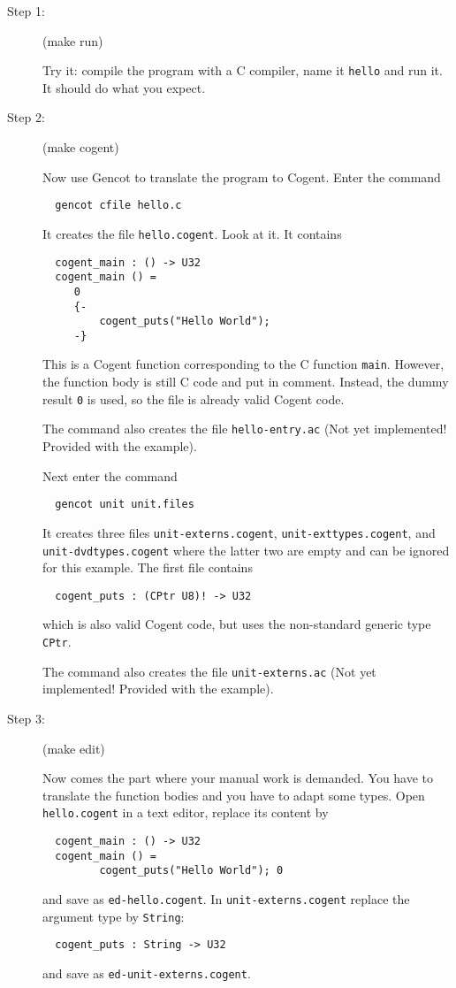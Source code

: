\documentclass[a4paper]{report}
\newcommand{\code}[1]{\textnormal{\texttt{#1}}}
\begin{document}
\begin{description}
\item[Step 1:] (make run)

Try it: compile the program with a C compiler, name it \code{hello} and run it. It should do what you expect.

\item[Step 2:] (make cogent)

Now use Gencot to translate the program to Cogent. Enter the command
\begin{verbatim}
  gencot cfile hello.c
\end{verbatim}
It creates the file \code{hello.cogent}. Look at it. It contains
\begin{verbatim}
  cogent_main : () -> U32
  cogent_main () =
     0
     {-
         cogent_puts("Hello World");
     -}
\end{verbatim}
This is a Cogent function corresponding to the C function \code{main}. However, the function body is still C code
and put in comment. Instead, the dummy result \code{0} is used, so the file is already valid Cogent code.

The command also creates the file \code{hello-entry.ac} (Not yet implemented! Provided with the example).

Next enter the command
\begin{verbatim}
  gencot unit unit.files
\end{verbatim}
It creates three files \code{unit-externs.cogent}, \code{unit-exttypes.cogent}, and \code{unit-dvdtypes.cogent}
where the latter two are empty and can be ignored for this example. The first file contains
\begin{verbatim}
  cogent_puts : (CPtr U8)! -> U32
\end{verbatim}
which is also valid Cogent code, but uses the non-standard generic type \code{CPtr}. 

The command also creates the file \code{unit-externs.ac} (Not yet implemented! Provided with the example).

\item[Step 3:] (make edit)

Now comes the part where your manual work is demanded. You have to translate the function bodies and you have to adapt
some types. Open \code{hello.cogent} in a text editor, replace its content by
\begin{verbatim}
  cogent_main : () -> U32
  cogent_main () =
         cogent_puts("Hello World"); 0
\end{verbatim}
and save as \code{ed-hello.cogent}. In \code{unit-externs.cogent} replace the argument type by \code{String}:
\begin{verbatim}
  cogent_puts : String -> U32
\end{verbatim}
and save as \code{ed-unit-externs.cogent}.


\end{description}
\end{document}
